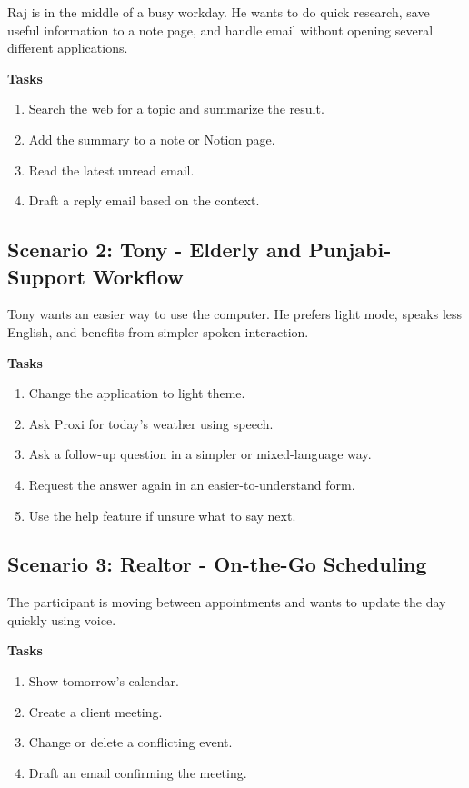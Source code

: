 \documentclass[12pt, titlepage]{article}
\begin{document}
Raj is in the middle of a busy workday. He wants to do quick research,
save useful information to a note page, and handle email without opening
several different applications.

\textbf{Tasks}
\begin{enumerate}[label=\arabic*.]
    \item Search the web for a topic and summarize the result.
    \item Add the summary to a note or Notion page.
    \item Read the latest unread email.
    \item Draft a reply email based on the context.
\end{enumerate}

\subsection{Scenario 2: Tony - Elderly and Punjabi-Support Workflow}

Tony wants an easier way to use the computer. He prefers light mode,
speaks less English, and benefits from simpler spoken interaction.

\textbf{Tasks}
\begin{enumerate}[label=\arabic*.]
    \item Change the application to light theme.
    \item Ask Proxi for today's weather using speech.
    \item Ask a follow-up question in a simpler or mixed-language way.
    \item Request the answer again in an easier-to-understand form.
    \item Use the help feature if unsure what to say next.
\end{enumerate}

\subsection{Scenario 3: Realtor - On-the-Go Scheduling}

The participant is moving between appointments and wants to update the
day quickly using voice.

\textbf{Tasks}
\begin{enumerate}[label=\arabic*.]
    \item Show tomorrow's calendar.
    \item Create a client meeting.
    \item Change or delete a conflicting event.
    \item Draft an email confirming the meeting.
\end{enumerate}
\end{document}
